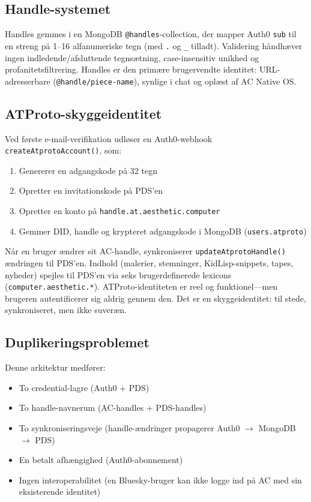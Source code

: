 \documentclass[10pt,letterpaper,twocolumn]{article}
\begin{document}
\subsection{Handle-systemet}

Handles gemmes i en MongoDB \texttt{@handles}-collection, der mapper Auth0 \texttt{sub} til en streng på 1--16 alfanumeriske tegn (med \texttt{.} og \texttt{\_} tilladt). Validering håndhæver ingen indledende/afsluttende tegnsætning, case-insensitiv unikhed og profanitetsfiltrering. Handles er den primære brugervendte identitet: URL-adresserbare (\texttt{@handle/piece-name}), synlige i chat og oplæst af AC Native OS.

\subsection{ATProto-skyggeidentitet}

Ved første e-mail-verifikation udløser en Auth0-webhook \texttt{createAtprotoAccount()}, som:

\begin{enumerate}
  \item Genererer en adgangskode på 32 tegn
  \item Opretter en invitationskode på PDS'en
  \item Opretter en konto på \texttt{handle.at.aesthetic.computer}
  \item Gemmer DID, handle og krypteret adgangskode i MongoDB (\texttt{users.atproto})
\end{enumerate}

Når en bruger ændrer sit AC-handle, synkroniserer \texttt{updateAtprotoHandle()} ændringen til PDS'en. Indhold (malerier, stemninger, KidLisp-snippets, tapes, nyheder) spejles til PDS'en via seks brugerdefinerede lexicons (\texttt{computer.aesthetic.*}). ATProto-identiteten er reel og funktionel---men brugeren autentificerer sig aldrig gennem den. Det er en skyggeidentitet: til stede, synkroniseret, men ikke suveræn.

\subsection{Duplikeringsproblemet}

Denne arkitektur medfører:

\begin{itemize}
  \item To credential-lagre (Auth0 + PDS)
  \item To handle-navnerum (AC-handles + PDS-handles)
  \item To synkroniseringsveje (handle-ændringer propagerer Auth0 $\to$ MongoDB $\to$ PDS)
  \item En betalt afhængighed (Auth0-abonnement)
  \item Ingen interoperabilitet (en Bluesky-bruger kan ikke logge ind på AC med sin eksisterende identitet)
\end{itemize}
\end{document}
